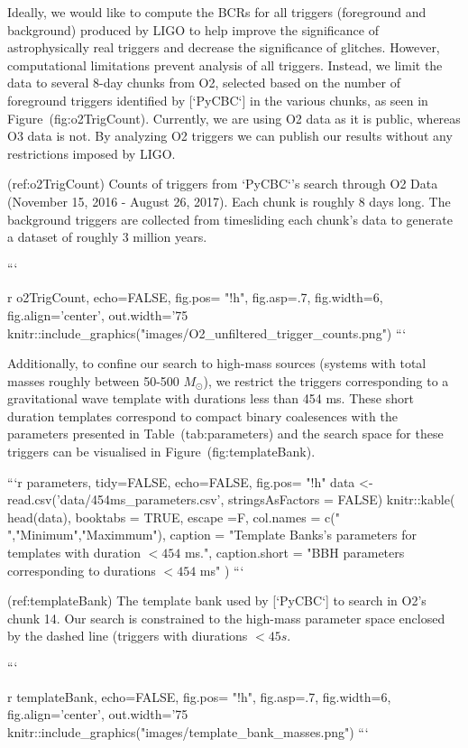 {{Ideally, we would like to compute the BCRs for all triggers (foreground and background) produced by LIGO to help improve
the significance of astrophysically real triggers and decrease the significance of glitches. However, computational
limitations prevent analysis of all triggers. Instead, we limit the data to several 8-day chunks from O2, selected based
on the number of foreground triggers identified by [`PyCBC`] in the various chunks, as seen in
Figure~\@ref(fig:o2TrigCount). Currently, we are using O2 data as it is public, whereas O3 data is not. By analyzing O2
triggers we can publish our results without any restrictions imposed by LIGO.

(ref:o2TrigCount) Counts of triggers from `PyCBC`'s search through O2 Data (November 15, 2016 - August 26, 2017). Each chunk is roughly 8 days long. The background triggers are collected from timesliding each chunk's data to generate a dataset of roughly 3 million years.

```{r o2TrigCount, echo=FALSE, fig.pos= "!h", fig.asp=.7, fig.width=6, fig.align='center', out.width='75%
knitr::include_graphics("images/O2_unfiltered_trigger_counts.png")
```

Additionally, to confine our search to high-mass sources (systems with total masses roughly between 50-500
$M_{\odot}$), we restrict the triggers corresponding to a gravitational wave template with durations less than 454 ms.
These short duration templates correspond to compact binary coalesences with the parameters presented in
Table~\@ref(tab:parameters) and the search space for these triggers can be visualised in Figure~\@ref(fig:templateBank).

```{r parameters, tidy=FALSE, echo=FALSE, fig.pos= "!h"}
data <- read.csv('data/454ms_parameters.csv',  stringsAsFactors = FALSE)
knitr::kable(
  head(data), booktabs = TRUE, escape =F,
  col.names = c(" ","Minimum","Maximmum"),
  caption = "Template Banks's parameters for templates with duration $<454$ ms.",
  caption.short = "BBH parameters corresponding to durations $<454$ ms"
)
```

(ref:templateBank) The template bank used by [`PyCBC`] to search in O2's chunk 14. Our search is constrained to the high-mass parameter space enclosed by the dashed line (triggers with diurations $<45s$.  

```{r templateBank, echo=FALSE, fig.pos= "!h", fig.asp=.7, fig.width=6, fig.align='center', out.width='75%
knitr::include_graphics("images/template_bank_masses.png")
```

}}}}

